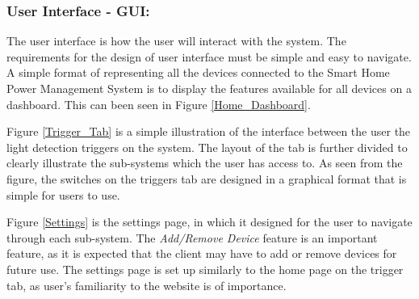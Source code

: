 \documentclass[10pt,twocolumn]{witseiepaper}
\begin{document}
	\subsubsection{User Interface - GUI:}
	The user interface is how the user will interact with the system. The requirements for the design of user interface must be simple and easy to navigate. A simple format of representing all the devices connected to the Smart Home Power Management System is to display the features available for all devices on a dashboard. This can been seen in Figure \ref{Home_Dashboard}.
	
	Figure \ref{Trigger_Tab} is a simple illustration of the interface between the user the light detection triggers on the system. The layout of the tab is further divided to clearly illustrate the sub-systems which the user has access to. As seen from the figure, the switches on the triggers tab are designed in a graphical format that is simple for users to use.  
	
	Figure \ref{Settings} is the settings page, in which it designed for the user to navigate through each sub-system. The \textit{Add/Remove Device} feature is an important feature, as it is expected that the client may have to add or remove devices for future use. The settings page is set up similarly to the home page on the trigger tab, as user's  familiarity to the website is of importance.
	
\end{document}
